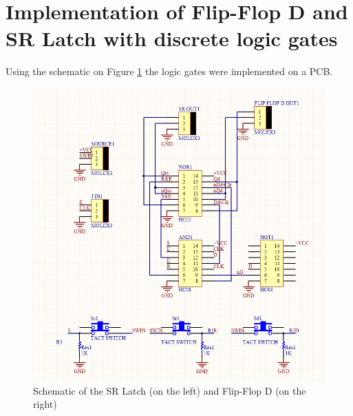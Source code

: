 \documentclass[a4paper]{article}
\begin{document}
        \section{Implementation of Flip-Flop D and SR Latch with discrete logic gates}
        Using the schematic on Figure \ref{fig:Schem} the logic gates were implemented on a PCB.
        
        \begin{figure}[h!]
            \begin{center}
                \includegraphics[width=\linewidth]{e6Schem.png}
                \caption{Schematic of the  SR Latch (on the left) and Flip-Flop D (on the right)}
            \end{center}
            \label{fig:Schem}
        \end{figure}
\end{document}
